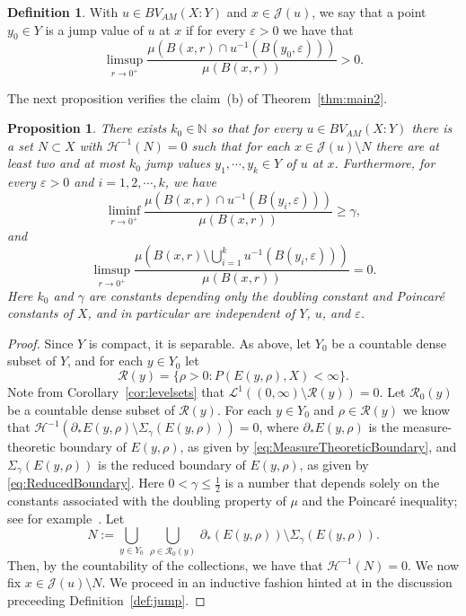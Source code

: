 \documentclass[11pt, letterpaper]{amsart} %
\newcommand*{\N}{{\mathbb N}}
\newcommand*{\eps}{\varepsilon}
\numberwithin{equation}{section}
\theoremstyle{plain}
\newtheorem{prop}[equation]{Proposition}
\theoremstyle{definition}
\newtheorem{definition}[equation]{Definition}
\begin{document}
{\begin{definition}
With $u\in BV_{AM}(X:Y)$ and $x\in\mathcal{J}(u)$, we say that a point $y_0\in Y$ is a jump value of $u$ at $x$ if
for every $\eps>0$ we have that
\[
\limsup_{r\to 0^+}\frac{\mu(B(x,r)\cap u^{-1}(B(y_0,\eps)))}{\mu(B(x,r))}>0.
\]
\end{definition}

The next proposition verifies the claim~(b) of Theorem~\ref{thm:main2}.


\begin{prop}\label{prop:finitejumps} 
There exists $k_0\in\N$ so that for every $u\in BV_{AM}(X:Y)$ there is a set $N\subset X$ with 
$\mathcal{H}^{-1}(N)=0$
such that for each $x\in\mathcal{J}(u)\setminus N$ there are at least two and at most 
$k_0$ jump values $y_1,\cdots,y_k\in Y$ of $u$ at $x$.  Furthermore, for every $\eps>0$ and $i=1,2,\cdots, k$, we have
\[
\liminf_{r\to 0^+}\frac{\mu(B(x,r)\cap u^{-1}(B(y_i,\eps)))}{\mu(B(x,r))}\ge \gamma,
\]
and
\[
\limsup_{r\to 0^+}\frac{\mu(B(x,r)\setminus \bigcup_{i=1}^ku^{-1}(B(y_i,\eps)))}{\mu(B(x,r))}=0.
\]
Here $k_0$ and $\gamma$ are constants depending only the doubling constant and Poincar\'e constants of $X$, 
and in particular are independent of $Y$, $u$, and $\eps$. 
\end{prop}


\begin{proof}
Since $Y$ is compact, it is separable.  As above, let $Y_0$ be a countable dense subset of $Y$, and for each $y\in Y_0$ let
\[
\mathcal{R}(y)=\{ \rho>0 :P(E(y,\rho),X)<\infty \}.
\]
Note from Corollary~\ref{cor:levelsets} that $\mathcal{L}^1((0,\infty)\setminus\mathcal{R}(y))=0$. Let $\mathcal{R}_0(y)$ be a
countable dense subset of $\mathcal{R}(y)$. For each $y\in Y_0$ and $\rho\in\mathcal{R}(y)$ we know that
$\mathcal{H}^{-1}(\partial_*E(y,\rho)\setminus \Sigma_\gamma(E(y,\rho)))=0$, where
$\partial_*E(y,\rho)$ is the measure-theoretic boundary of $E(y,\rho)$, as given by \eqref{eq:MeasureTheoreticBoundary}, and $\Sigma_\gamma(E(y,\rho))$ is the reduced boundary of $E(y,\rho)$, as given by \eqref{eq:ReducedBoundary}. 
Here $0<\gamma\le\tfrac12$ is a number that depends solely on the constants associated with the doubling property of $\mu$
and the Poincar\'e inequality; see for example~\cite[Theorem~5.3]{Ambrosio}. Let
\[
N:=\bigcup_{y\in Y_0}\, \bigcup_{\rho\in \mathcal{R}_0(y)}\, \partial_*(E(y,\rho))\setminus\Sigma_\gamma(E(y,\rho)).
\]
Then, by the countability of the collections, we have that $\mathcal{H}^{-1}(N)=0$. We now fix 
$x\in\mathcal{J}(u)\setminus N$. We proceed in an inductive fashion hinted at in the discussion preceeding 
Definition~\ref{def:jump}. 


\end{proof}}
\end{document}
